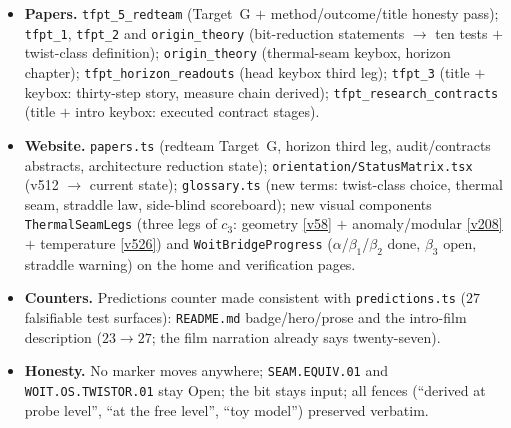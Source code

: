 \begin{itemize}[leftmargin=1.5em]
\item \textbf{Papers.} \texttt{tfpt\_5\_redteam} (Target~G $+$ method/outcome/title honesty pass);
\texttt{tfpt\_1}, \texttt{tfpt\_2} and \texttt{origin\_theory} (bit-reduction statements $\to$ ten
tests $+$ twist-class definition); \texttt{origin\_theory} (thermal-seam keybox, horizon chapter);
\texttt{tfpt\_horizon\_readouts} (head keybox third leg); \texttt{tfpt\_3} (title $+$ keybox:
thirty-step story, measure chain derived); \texttt{tfpt\_research\_contracts} (title $+$ intro keybox:
executed contract stages).
\item \textbf{Website.} \texttt{papers.ts} (redteam Target~G, horizon third leg, audit/contracts
abstracts, architecture reduction state); \texttt{orientation/StatusMatrix.tsx} (v512 $\to$ current state);
\texttt{glossary.ts} (new terms: twist-class choice, thermal seam, straddle law, side-blind scoreboard);
new visual components \texttt{ThermalSeamLegs} (three legs of $c_3$: geometry \vref{v58} $+$
anomaly/modular \vref{v208} $+$ temperature \vref{v526}) and \texttt{WoitBridgeProgress}
($\alpha$/$\beta_1$/$\beta_2$ done, $\beta_3$ open, straddle warning) on the home and verification pages.
\item \textbf{Counters.} Predictions counter made consistent with \texttt{predictions.ts} ($27$
falsifiable test surfaces): \texttt{README.md} badge/hero/prose and the intro-film description
($23\to27$; the film narration already says twenty-seven).
\item \textbf{Honesty.} No marker moves anywhere; \texttt{SEAM.EQUIV.01} and
\texttt{WOIT.OS.TWISTOR.01} stay Open; the bit stays input; all fences (``derived at probe level'',
``at the free level'', ``toy model'') preserved verbatim.
\end{itemize}

